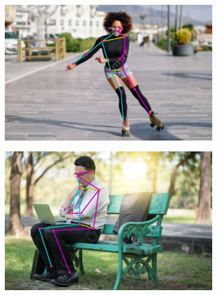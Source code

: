 \begin{figure}[p]
\begin{subfigure}[b]{.5\textwidth}
	\centering
	\includegraphics[width=\textwidth]{./images/MoveNet/19}
	\caption{ }
\end{subfigure}
\begin{subfigure}[b]{.5\textwidth}
	\centering
    \includegraphics[width=\textwidth]{./images/MoveNet/23}
    \caption{ }
\end{subfigure}
\begin{subfigure}[b]{.5\textwidth}
	\centering

\end{subfigure}
\end{figure}
